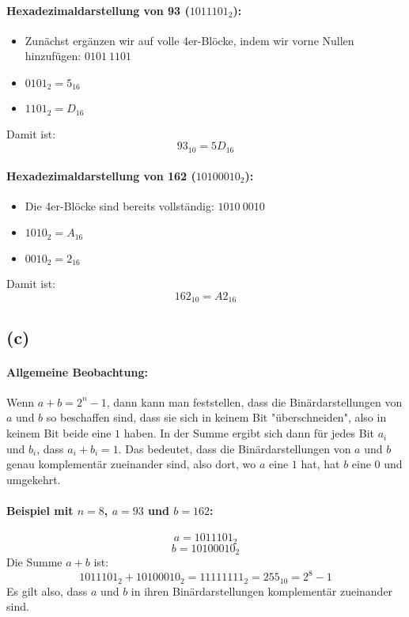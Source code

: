 \documentclass[a4paper]{scrartcl}
\begin{document}
\paragraph{Hexadezimaldarstellung von 93 (\(1011101_2\)):}
\begin{itemize}
    \item Zunächst ergänzen wir auf volle 4er-Blöcke, indem wir vorne Nullen hinzufügen: \( 0101 \ 1101 \)
    \item \( 0101_2 = 5_{16} \)
    \item \( 1101_2 = D_{16} \)
\end{itemize}
Damit ist:
\[
93_{10} = 5D_{16}
\]

\paragraph{Hexadezimaldarstellung von 162 (\(10100010_2\)):}
\begin{itemize}
    \item Die 4er-Blöcke sind bereits vollständig: \( 1010 \ 0010 \)
    \item \( 1010_2 = A_{16} \)
    \item \( 0010_2 = 2_{16} \)
\end{itemize}
Damit ist:
\[
162_{10} = A2_{16}
\]

\subsection*{(c)}

\paragraph{Allgemeine Beobachtung:}
Wenn \( a + b = 2^n - 1 \), dann kann man feststellen, dass die Binärdarstellungen von \( a \) und \( b \) so beschaffen sind, dass sie sich in keinem Bit "überschneiden", also in keinem Bit beide eine \( 1 \) haben. In der Summe ergibt sich dann für jedes Bit \( a_i \) und \( b_i \), dass \( a_i + b_i = 1 \). Das bedeutet, dass die Binärdarstellungen von \( a \) und \( b \) genau komplementär zueinander sind, also dort, wo \( a \) eine \( 1 \) hat, hat \( b \) eine \( 0 \) und umgekehrt.

\paragraph{Beispiel mit \( n = 8 \), \( a = 93 \) und \( b = 162 \):}
\[
a = 1011101_2
\]
\[
b = 10100010_2
\]
Die Summe \( a + b \) ist:
\[
1011101_2 + 10100010_2 = 11111111_2 = 255_{10} = 2^8 - 1
\]
Es gilt also, dass \( a \) und \( b \) in ihren Binärdarstellungen komplementär zueinander sind.
\end{document}
